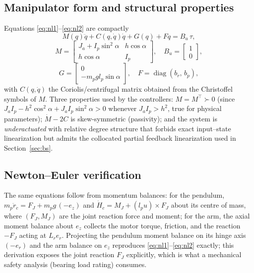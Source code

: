 \documentclass[conference]{IEEEtran}
\newcommand{\diag}{\operatorname{diag}}
\begin{document}
\subsection{Manipulator form and structural properties}
Equations \eqref{eq:nl1}--\eqref{eq:nl2} are compactly
\begin{equation}
M(q)\ddot q + C(q,\dot q)\dot q + G(q) + F\dot q = B_u\,\tau,
\label{eq:manip}
\end{equation}
\begin{equation}
M = \begin{bmatrix} J_a + I_p \sin^2\!\alpha & h\cos\alpha\\ h\cos\alpha & I_p \end{bmatrix},\quad
B_u = \begin{bmatrix}1\\0\end{bmatrix},
\end{equation}
\begin{equation}
G = \begin{bmatrix}0\\ -m_p g l_p\sin\alpha\end{bmatrix},\quad
F = \diag(b_r,\,b_p),
\end{equation}
with $C(q,\dot q)$ the Coriolis/centrifugal matrix obtained from the Christoffel symbols of $M$. Three properties used by the controllers: $M = M^{\!\top}\!\succ 0$ (since $J_a I_p - h^2\cos^2\!\alpha + J_a I_p \sin^2\!\alpha > 0$ whenever $J_a I_p > h^2$, true for physical parameters); $\dot M - 2C$ is skew-symmetric (passivity); and the system is \emph{underactuated} with relative degree structure that forbids exact input--state linearization but admits the collocated partial feedback linearization used in Section~\ref{sec:bs}.

\subsection{Newton--Euler verification}
The same equations follow from momentum balances: for the pendulum, $m_p\ddot r_c = F_J + m_p g\,(-e_z)$ and $\dot H_c = M_J + (l_p u)\times F_J$ about its centre of mass, where $(F_J, M_J)$ are the joint reaction force and moment; for the arm, the axial moment balance about $e_z$ collects the motor torque, friction, and the reaction $-F_J$ acting at $L_r e_r$. Projecting the pendulum moment balance on its hinge axis $(-e_r)$ and the arm balance on $e_z$ reproduces \eqref{eq:nl1}--\eqref{eq:nl2} exactly; this derivation exposes the joint reaction $F_J$ explicitly, which is what a mechanical safety analysis (bearing load rating) consumes.
\end{document}
